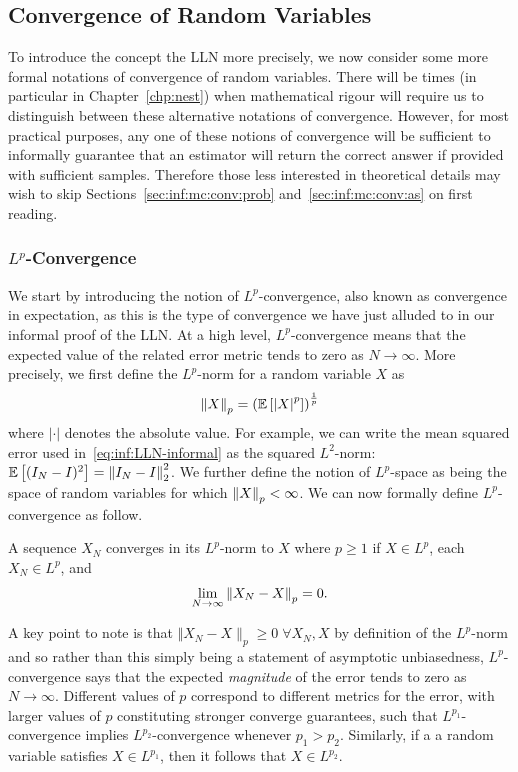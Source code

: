 \subsection{Convergence of Random Variables}
\label{sec:inf:mc:conv}

To introduce the concept the LLN more precisely, we now consider some more formal notations
of convergence of random variables.  There will be times (in particular in Chapter~\ref{chp:nest})
when mathematical rigour will require us to distinguish between these alternative notations of convergence.
However, for most practical purposes, any one of these notions of convergence will be sufficient 
to informally guarantee that an estimator will return the correct answer if provided 
with sufficient samples.  Therefore those less interested in theoretical details may wish to
skip Sections~\ref{sec:inf:mc:conv:prob} and~\ref{sec:inf:mc:conv:as} on first reading.

\subsubsection{$L^p$-Convergence}
\label{sec:inf:mc:conv:Lr}

We start by introducing the notion of $L^p$-convergence, also known as convergence in expectation,
as this is the type of convergence we have just alluded to in our informal proof of the LLN.
At a high level, $L^p$-convergence means that the expected value of the related error metric
tends to zero as $N\rightarrow \infty$.  More precisely, we first define the $L^p$-norm for
a random variable $X$ as
\begin{align}
\label{eq:inf:Lp-norm}
\left\lVert X\right\rVert_p = \left(\mathbb{E} \left[\left|X\right|^{p}\right]\right)^{\frac{1}{p}}
\end{align}
where $\left|\cdot\right|$ denotes the absolute value.  For example, we can write the
mean squared error used in~\eqref{eq:inf:LLN-informal} as the squared $L^2$-norm:
$\mathbb{E} \left[(I_N-I)^2\right] = \left\lVert I_N-I\right\rVert_2^2$.  We further define the notion of $L^p$-space
as being the space of random variables for which $\left\lVert X\right\rVert_p < \infty$.  We can now
formally define $L^p$-convergence as follow.
\begin{definition}[$L^p$-convergence]
A sequence $X_N$ converges in its $L^p$-norm to $X$ where $p\ge1$ if $X\in L^p$, each $X_N \in L^p$, and
\begin{align}
\lim\limits_{N\rightarrow\infty} \left\lVert X_N-X\right\rVert_p=0. \label{eq:inf:Lp-conv-formal}
\end{align}
\end{definition}
A key point to note is that $\Vert X_N-X\rVert_p\ge0 \; \forall X_N, X$ by definition of the $L^p$-norm and so
rather than this simply being a statement of asymptotic unbiasedness, $L^p$-convergence says that the expected
\emph{magnitude} of the error tends to zero as $N\rightarrow\infty$.
Different values of $p$ correspond to different metrics for the error, with larger values of
$p$ constituting stronger converge guarantees, such that $L^{p_1}$-convergence implies
$L^{p_2}$-convergence whenever $p_1>p_2$.  Similarly, if a a random variable satisfies
$X \in L^{p_1}$, then it follows that $X \in L^{p_2}$.

